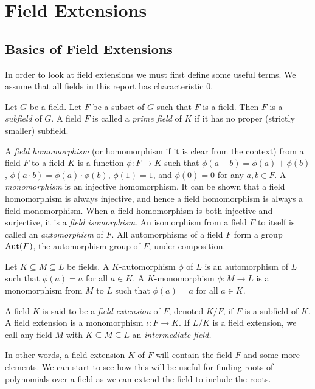 \section{Field Extensions}

\subsection{Basics of Field Extensions}
In order to look at field extensions we must first define some useful terms. We assume that all fields in this report has characteristic $0$. 
\begin{definition}
Let $G$ be a field. Let \(F\) be a subset of \(G\) such that $F$ is a field. Then $F$ is a \textit{subfield}
 of $G$.
A field \(F\) is called a \textit{prime field} of \(K\) if it has no proper (strictly smaller) subfield.
\end{definition}
\begin{definition}
	A \textit{field homomorphism} (or homomorphism if it is clear from the context) from a field $F$ to a field $K$ is a function $\phi: F \to K$ such that $\phi(a + b) = \phi(a) + \phi(b)$, $\phi(a\cdot b) = \phi(a) \cdot \phi(b)$, $\phi(1) = 1$, and $\phi(0) = 0$ for any $a, b \in F$. 
    A \textit{monomorphism} is an injective homomorphism. It can be shown that a field homomorphism is always injective, and hence a field homomorphism is always a field monomorphism. 
	When a field homomorphism is both injective and surjective, it is a \textit{field isomorphism}. An isomorphism from a field $F$ to itself is called an \textit{automorphism} of $F$. All automorphisms of a field $F$ form a group $\operatorname{Aut}(F)$, the automorphism group of $F$, under composition. 
\end{definition}

\begin{definition} \label{def:automorphism}
	Let $K \subseteq M \subseteq L$ be fields. A $K$-automorphism $\phi$ of $L$ is an automorphism of $L$ such that $\phi(a) = a$ for all $a \in K$. 
	A $K$-monomorphism $\phi : M \to L$ is a monomorphism from $M$ to $L$ such that $\phi(a) = a$ for all $a \in K$. 
\end{definition}

\begin{definition}
A field \(K\) is said to be a \textit{field extension} of \(F\), denoted \(K / F\), if \(F\) is a subfield of \(K\). \cite{Moy} A field extension is a monomorphism \(\iota: F \to K\). If $L/K$ is a field extension, we call any field $M$ with $K \subseteq M \subseteq L$ an \textit{intermediate field.}
\end{definition}
In other words, a field extension \(K\) of \(F\) will contain the field \(F\) and some more elements. We can start to see how this will be useful for finding roots of polynomials over a field as we can extend the field to include the roots.

